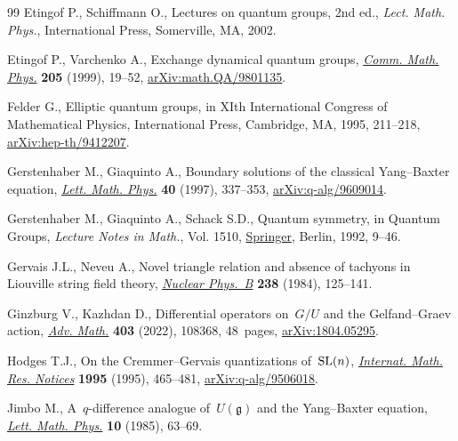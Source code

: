 \documentclass[10pt,a4paper]{amsart}
\numberwithin{equation}{section}
\begin{document}
\begin{thebibliography}{99}
Etingof P., Schiffmann O., Lectures on quantum groups, 2nd ed., \textit{Lect. Math. Phys.}, International Press, Somerville, MA, 2002.

Etingof P., Varchenko A., Exchange dynamical quantum groups, \href{https://doi.org/10.1007/s002200050665}{\textit{Comm.
 Math. Phys.}} \textbf{205} (1999), 19--52, \href{https://arxiv.org/abs/math.QA/9801135}{arXiv:math.QA/9801135}.

Felder G., Elliptic quantum groups, in X{I}th {I}nternational {C}ongress of
 {M}athematical {P}hysics, International Press, Cambridge, MA, 1995, 211--218,
 \href{https://arxiv.org/abs/hep-th/9412207}{arXiv:hep-th/9412207}.

Gerstenhaber M., Giaquinto A., Boundary solutions of the classical
 {Y}ang--{B}axter equation, \href{https://doi.org/10.1023/A:1007363911649}{\textit{Lett. Math. Phys.}} \textbf{40} (1997),
 337--353, \href{https://arxiv.org/abs/q-alg/9609014}{arXiv:q-alg/9609014}.

Gerstenhaber M., Giaquinto A., Schack S.D., Quantum symmetry, in Quantum
 {G}roups, \textit{Lecture Notes in Math.}, Vol. 1510, \href{https://doi.org/10.1007/BFb0101176}{Springer}, Berlin, 1992,
 9--46.

Gervais J.L., Neveu A., Novel triangle relation and absence of tachyons in
 {L}iouville string field theory, \href{https://doi.org/10.1016/0550-3213(84)90469-3}{\textit{Nuclear Phys.~B}} \textbf{238}
 (1984), 125--141.

Ginzburg V., Kazhdan D., Differential operators on~{$G/U$} and the
 {G}elfand--{G}raev action, \href{https://doi.org/10.1016/j.aim.2022.108368}{\textit{Adv. Math.}} \textbf{403} (2022), 108368,
 48~pages, \href{https://arxiv.org/abs/1804.05295}{arXiv:1804.05295}.

Hodges T.J., On the {C}remmer--{G}ervais quantizations of~{${\rm SL}(n)$},
  \href{https://doi.org/10.1155/S107379289500033X}{\textit{Internat. Math. Res. Notices}} \textbf{1995} (1995), 465--481,
 \href{https://arxiv.org/abs/q-alg/9506018}{arXiv:q-alg/9506018}.

Jimbo M., A~{$q$}-difference analogue of~{$U({\mathfrak{g}})$} and the
 {Y}ang--{B}axter equation, \href{https://doi.org/10.1007/BF00704588}{\textit{Lett. Math. Phys.}} \textbf{10} (1985),
 63--69.


\end{thebibliography}
\end{document}

